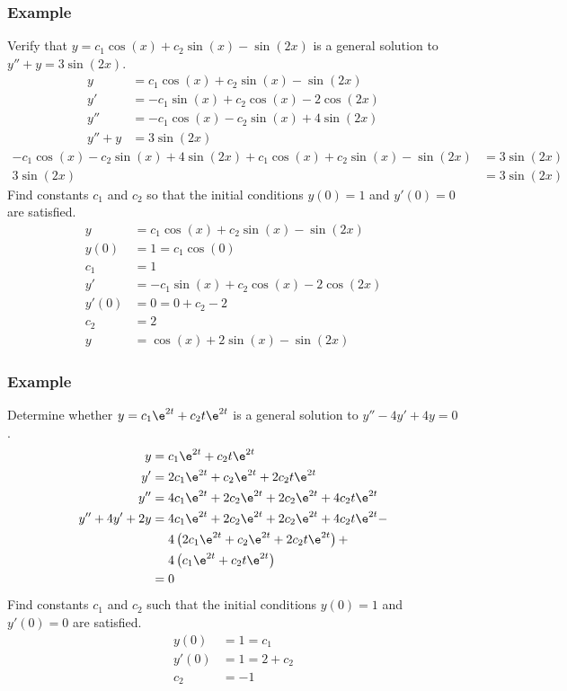 \documentclass{math}
\begin{document}
\subsubsection*{Example}
Verify that \( y = c_1\cos(x)+c_2\sin(x)-\sin(2x) \) is a general solution to
\( y''+y = 3\sin(2x) \).
\begin{align*}
  y &= c_1\cos(x)+c_2\sin(x)-\sin(2x) \\
  y' &= -c_1\sin(x)+c_2\cos(x)-2\cos(2x) \\
  y'' &= -c_1\cos(x)-c_2\sin(x)+4\sin(2x) \\
  y''+y &= 3\sin(2x)
\end{align*}
\begin{align*}
  -c_1\cos(x)-c_2\sin(x)+4\sin(2x)+c_1\cos(x)+c_2\sin(x)-\sin(2x) &=
    3\sin(2x) \\
  3\sin(2x) &= 3\sin(2x)
\end{align*}
Find constants \( c_1 \) and \( c_2 \) so that the initial conditions
\( y(0) = 1 \) and \( y'(0) = 0 \) are satisfied.
\begin{align*}
  y &= c_1\cos(x)+c_2\sin(x)-\sin(2x) \\
  y(0) &= 1 = c_1\cos(0) \\
  c_1 &= 1 \\
  y' &= -c_1\sin(x)+c_2\cos(x)-2\cos(2x) \\
  y'(0) &= 0 = 0+c_2-2 \\
  c_2 &= 2 \\
  y &= \cos(x)+2\sin(x)-\sin(2x)
\end{align*}

\subsubsection*{Example}
Determine whether \( y = c_1\e^{2t}+c_2t\e^{2t} \) is a general solution to
\( y''-4y'+4y = 0 \).
\begin{align*}
  y &= c_1\e^{2t}+c_2t\e^{2t} \\
  y' &= 2c_1\e^{2t}+c_2\e^{2t}+2c_2t\e^{2t} \\
  y'' &= 4c_1\e^{2t}+2c_2\e^{2t}+2c_2\e^{2t}+4c_2t\e^{2t} \\
  y''+4y'+2y &= 4c_1\e^{2t}+2c_2\e^{2t}+2c_2\e^{2t}+4c_2t\e^{2t}- \\
    &~~~~ 4\left(2c_1\e^{2t}+c_2\e^{2t}+2c_2t\e^{2t}\right)+ \\
    &~~~~ 4\left(c_1\e^{2t}+c_2t\e^{2t}\right) \\
  &= 0
\end{align*}
Find constants \( c_1 \) and \( c_2 \) such that the initial conditions
\( y(0) = 1 \) and \( y'(0) = 0 \) are satisfied.
\begin{align*}
  y(0) &= 1 = c_1 \\
  y'(0) &= 1 = 2+c_2 \\
  c_2 &= -1
\end{align*}
\end{document}
